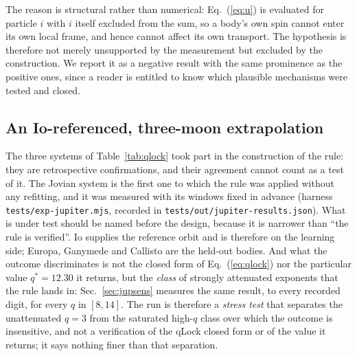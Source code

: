 \documentclass[aps,reprint,amsmath,amssymb,nofootinbib,superscriptaddress,floatfix]{revtex4-2}
\begin{document}
The reason is structural rather than numerical: Eq.~(\ref{eq:u}) is
evaluated for particle $i$ with $i$ itself excluded from the sum, so a
body's own spin cannot enter its own local frame, and hence cannot
affect its own transport.
The hypothesis is therefore not merely unsupported by the measurement
but excluded by the construction.
We report it as a negative result with the same prominence as the
positive ones, since a reader is entitled to know which plausible
mechanisms were tested and closed.

\subsection{An Io-referenced, three-moon extrapolation}
\label{sec:jupiter}

The three systems of Table~\ref{tab:qlock} took part in the
construction of the rule: they are retrospective confirmations, and
their agreement cannot count as a test of it.
The Jovian system is the first one to which the rule was applied
without any refitting, and it was measured with its windows fixed in
advance (harness \texttt{tests/exp-jupiter.mjs}, recorded in
\texttt{tests/out/jupiter-results.json}).
What is under test should be named before the design, because it is
narrower than ``the rule is verified''.
Io supplies the reference orbit and is therefore on the learning side;
Europa, Ganymede and Callisto are the held-out bodies.
And what the outcome discriminates is not the closed form of
Eq.~(\ref{eq:qlock}) nor the particular value $q^{*}=12.30$ it returns,
but the \emph{class} of strongly attenuated exponents that the rule
lands in: Sec.~\ref{sec:jupsens} measures the same result, to every
recorded digit, for every $q$ in $[8,14]$.
The run is therefore a \emph{stress test} that separates the
unattenuated $q=3$ from the saturated high-$q$ class over which the
outcome is insensitive, and not a verification of the qLock closed form
or of the value it returns; it says nothing finer than that
separation.
\end{document}
